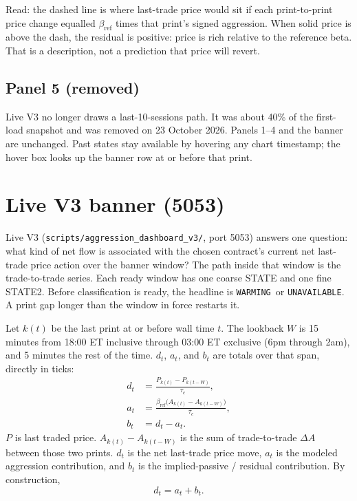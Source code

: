 \documentclass[11pt]{article}
\newcommand{\Warming}{\texttt{WARMING}}
\newcommand{\Unavailable}{\texttt{UNAVAILABLE}}
\begin{document}
Read: the dashed line is where last-trade price would sit if each print-to-print price change equalled $\beta_{\mathrm{ref}}$ times that print's signed aggression. When solid price is above the dash, the residual is positive: price is rich relative to the reference beta. That is a description, not a prediction that price will revert.

\subsection{Panel 5 (removed)}

Live V3 no longer draws a last-10-sessions path. It was about 40\% of the first-load snapshot and was removed on 23 October 2026. Panels 1--4 and the banner are unchanged. Past states stay available by hovering any chart timestamp; the hover box looks up the banner row at or before that print.

\section{Live V3 banner (5053)}

Live V3 (\texttt{scripts/aggression\_dashboard\_v3/}, port 5053) answers one question: what kind of net flow is associated with the chosen contract's current net last-trade price action over the banner window? The path inside that window is the trade-to-trade series. Each ready window has one coarse STATE and one fine STATE2. Before classification is ready, the headline is \Warming\ or \Unavailable. A print gap longer than the window in force restarts it.

Let $k(t)$ be the last print at or before wall time $t$. The lookback $W$ is 15 minutes from 18:00 ET inclusive through 03:00 ET exclusive (6pm through 2am), and 5 minutes the rest of the time. $d_t$, $a_t$, and $b_t$ are totals over that span, directly in ticks:
\begin{align}
d_t &= \frac{P_{k(t)}-P_{k(t-W)}}{\tau_c},\\
a_t &= \frac{\beta_{\mathrm{ref}}\bigl(A_{k(t)}-A_{k(t-W)}\bigr)}{\tau_c},\\
b_t &= d_t-a_t.
\end{align}
$P$ is last traded price. $A_{k(t)}-A_{k(t-W)}$ is the sum of trade-to-trade $\Delta A$ between those two prints. $d_t$ is the net last-trade price move, $a_t$ is the modeled aggression contribution, and $b_t$ is the implied-passive / residual contribution. By construction,
\begin{equation}
\boxed{d_t=a_t+b_t.}
\end{equation}
\end{document}
